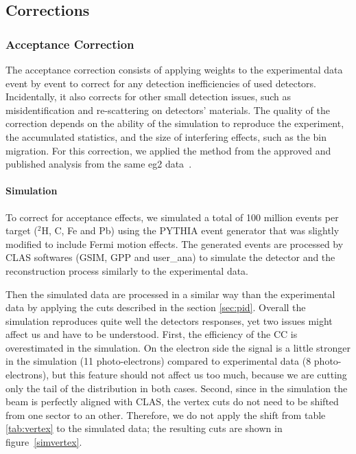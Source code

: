 \subsection{Corrections}
\label{sec:corrections}

\subsubsection{Acceptance Correction}
\label{sec:accept}

The acceptance correction consists of applying weights to the experimental data
event by event to correct for any detection inefficiencies of used detectors.
Incidentally, it also corrects for other small detection issues, such as misidentification and re-scattering on detectors' materials. The quality 
of the correction depends on the ability of the simulation to reproduce the 
experiment, the accumulated statistics, and the size of interfering effects, such 
as the bin migration. For this correction, we applied the method from the 
approved and published analysis from the same eg2 data~\cite{ElFassi:2008}.

\paragraph{Simulation}
\label{sec:simul}

To correct for acceptance effects, we simulated a total of 100 million events 
per target ($^2$H, C, Fe and Pb) using the PYTHIA \cite{Sjostrand:2006za} 
event generator that was slightly modified to include Fermi motion effects. The 
generated events are processed by CLAS softwares (GSIM, GPP and user\_ana) 
to simulate the detector and the reconstruction process similarly to the experimental data.

Then the simulated data are processed in a similar way than the experimental data by 
applying the cuts described in the section \ref{sec:pid}. Overall the 
simulation reproduces quite well the detectors responses, yet two issues might 
affect us and have to be understood. First, the efficiency of the CC is 
overestimated in the simulation. On the electron side the signal is a little stronger in the simulation (11 
photo-electrons) compared to experimental data (8 photo-electrons), but this 
feature should not affect us too much, because we are cutting only the tail of the 
distribution in both cases. Second, since in the simulation the beam is perfectly aligned with CLAS, the vertex cuts do not need to be shifted from one sector to an other. Therefore, we do not apply the shift from table \ref{tab:vertex} to the simulated data; the resulting cuts are shown in figure~\ref{simvertex}.

